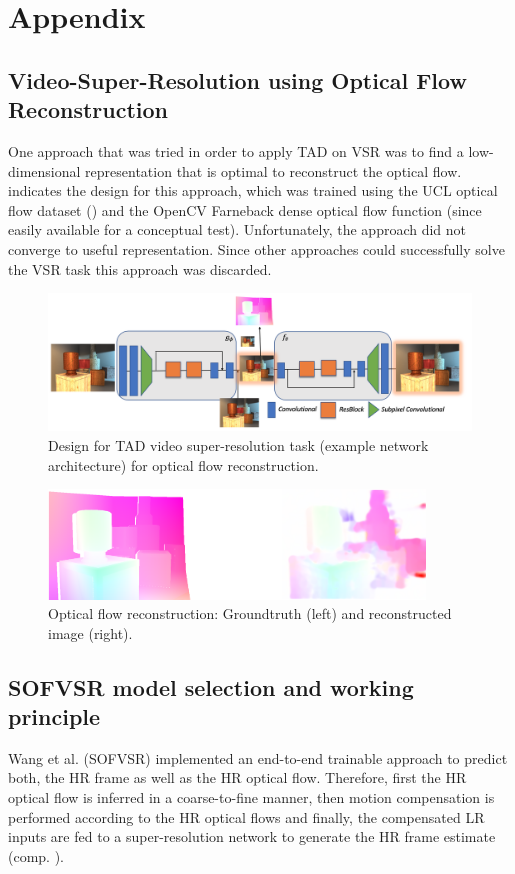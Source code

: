\newpage
\section{Appendix}
\label{sec:Appendix}

\subsection*{Video-Super-Resolution using Optical Flow Reconstruction}
One approach that was tried in order to apply \ac{TAD} on \ac{VSR} was to find a
low-dimensional representation that is optimal to reconstruct the optical flow.
 indicates the design for this
approach, which was trained using the UCL optical flow dataset (\cite{ADAEMFOF})
and the OpenCV Farneback dense optical flow function (since easily available
for a conceptual test).
Unfortunately, the approach did not converge to useful representation. Since
other approaches could successfully solve the \ac{VSR} task this approach was
discarded.

\begin{figure}[!ht]
	\centering
	\includegraphics[width=14cm]{figures/architecture_video_flow}
	\caption{Design for \ac{TAD} video super-resolution task (example network
  architecture) for optical flow reconstruction. }
  \label{fig:architecture_video_flow}
\end{figure}

\begin{figure}[!ht]
	\centering
	\includegraphics[width=10cm]{figures/flow}
	\caption{Optical flow reconstruction: Groundtruth (left) and reconstructed
  image (right).}
  \label{fig:flow}
\end{figure}

\subsection*{SOFVSR model selection and working principle}
Wang et al. \cite{LFVSRTHROFE} (SOFVSR) implemented an end-to-end trainable
approach to predict both, the \ac{HR} frame as well as the HR optical flow.
Therefore, first the HR optical flow is inferred in a coarse-to-fine manner,
then motion compensation is performed according to the HR optical flows and
finally, the compensated LR inputs are fed to a super-resolution network to
generate the HR frame estimate (comp. ).

